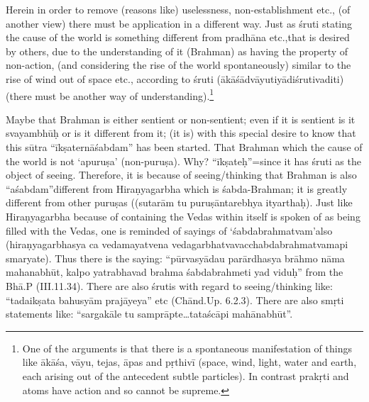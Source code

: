 Herein in order to remove (reasons like) uselessness, non-establish\-ment etc., (of another view) there must be application in a different way. Just as śruti stating the cause of the world is something different from pradhāna etc.,that is desired by others, due to the understanding of it (Brahman) as having the property of non-action, (and considering the rise of the world spontaneously) similar to the rise of wind out of space etc., according to śruti (ākāśādvāyutiyādiśrutivaditi) (there must be another way of understanding).\footnote{One of the arguments is that there is a spontaneous manifestation of things like ākāśa, vāyu, tejas, āpas and pṛthivī (space, wind, light, water and earth, each arising out of the antecedent subtle particles). In contrast prakṛti and atoms have action and so cannot be supreme.} 

Maybe that Brahman is either sentient or non-sentient; even if it is sentient is it svayambhūḥ or is it different from it; (it is) with this special desire to know that this sūtra “īkṣaternāśabdam” has been started. That Brahman which the cause of the world is not ‘apuruṣa’ (non-puruṣa). Why? “īkṣateḥ”=since it has śruti as the object of seeing. Therefore, it is because of seeing/thinking  that Brahman is also “aśabdam”different from Hiraṇyagarbha which is śabda-Brahman; it is greatly different from other puruṣas ((sutarām tu puruṣāntarebhya ityarthaḥ). Just like Hiraṇyagarbha because of containing the Vedas within itself is spoken of as being filled with the Vedas, one is reminded of sayings of ‘śabdabrahmatvam’also (hiraṇyagarbhasya ca vedamayatvena vedagarbhatvavacchabdabrahmatvamapi smaryate). Thus there is the saying: “pūrvasyādau parārdhasya brāhmo nāma mahanabhūt, kalpo yatrabhavad brahma śabdabrahmeti yad viduḥ” from the Bhā.P (III.11.34). There are also śrutis with regard to seeing/thinking like: “tadaikṣata bahusyām prajāyeya” etc (Chānd.Up. 6.2.3). There are also smṛti statements like: “sargakāle tu samprāpte…tataścāpi mahānabhūt”. 

